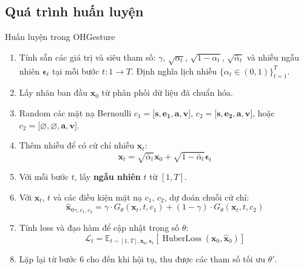 \subsection{Quá trình huấn luyện}


\begin{algorithm}[H]
	\caption{Huấn luyện trong OHGesture}
	\label{alg:trainingohgesture}
	\setlength{\baselineskip}{10pt}
	\begin{enumerate}
		\item Tính sẵn các giá trị và siêu tham số: $\gamma$, $\sqrt{\alpha_t}$, $\sqrt{1 - \alpha_t}$, $\sqrt{\bar{\alpha}_t}$ và nhiễu ngẫu nhiên $\boldsymbol{\epsilon}_t$ tại mỗi bước $t: 1 \rightarrow T$. Định nghĩa lịch nhiễu $\{\alpha_t \in (0, 1)\}_{t=1}^T$.
		
		\item Lấy nhãn ban đầu $\mathbf{x}_0$ từ phân phối dữ liệu đã chuẩn hóa.
		
		\item Random các mặt nạ Bernoulli $c_{1} = \big[ \mathbf{s}, \mathbf{e_1}, \mathbf{a}, \mathbf{v} \big]$, $c_{2} = \big[ \mathbf{s}, \mathbf{e_2}, \mathbf{a}, \mathbf{v} \big]$, hoặc $c_{2} = \big[ \varnothing, \varnothing, \mathbf{a}, \mathbf{v} \big]$.
		
		\item Thêm nhiễu để có cử chỉ nhiễu $\mathbf{x}_t$:
		\[
		\mathbf{x}_t = \sqrt{\bar{\alpha}_t} \mathbf{x}_0 + \sqrt{1 - \bar{\alpha}_t} \boldsymbol{\epsilon}_t
		\]
		
		\item Với mỗi bước $t$, lấy \textbf{ngẫu nhiên} $t$ từ $[1, T]$.
		
		\item Với $\mathbf{x}_t$, $t$ và các điều kiện mặt nạ $c_1$, $c_2$, dự đoán chuỗi cử chỉ:
		\[
		\hat{\mathbf{x}}_{0 \gamma, c_{1}, c_{2}} = \gamma \cdot G_{\theta} \left(\mathbf{x}_{t}, t, c_{1}\right) + (1 - \gamma) \cdot G_{\theta} \left(\mathbf{x}_{t}, t, c_{2}\right)
		\]
		
		\item Tính loss và đạo hàm để cập nhật trọng số $\theta$:
		\[
		\mathcal{L}_t = \mathbb{E}_{t \sim [1, T], \mathbf{x}_0, \boldsymbol{\epsilon}_t} \left[ \operatorname{HuberLoss}(\mathbf{x}_0, \hat{\mathbf{x}}_0 ) \right]
		\]
		
		\item Lặp lại từ bước 6 cho đến khi hội tụ, thu được các tham số tối ưu $\theta'$.
	\end{enumerate}
\end{algorithm}


